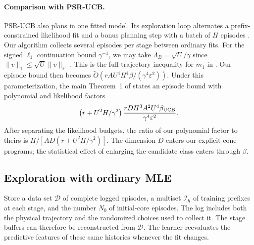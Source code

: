 \documentclass[sigconf,nonacm]{acmart}
\newcommand{\I}{\mathcal I}
\newcommand{\eps}{\varepsilon}
\newcommand{\softO}{\widetilde O}
\newcommand{\fused}[1]{\lVert #1\rVert_{\mathrm F}}
\begin{document}
\paragraph{Comparison with PSR-UCB.}
PSR-UCB also plans in one fitted model. Its exploration loop alternates a prefix-constrained likelihood fit and a bonus planning step with a batch of $H$ episodes \cite{psrucb}. Our algorithm collects several episodes per stage between ordinary fits. For the signed $\ell_1$ continuation bound $\gamma^{-1}$, we may take $\Lambda_B=\sqrt U/\gamma$ since $\|v\|_1\le\sqrt U\fused v$ \cite[Appendix~D.4]{bstable}. This is the full-trajectory inequality for $m_1$ in \citet[Condition~4.3]{omle}. Our episode bound then becomes $\softO(rAU^4H^4\beta/(\gamma^4\eps^2))$. Under this parameterization, the main Theorem~1 of \citet{psrucb} states an episode bound with polynomial and likelihood factors
\[
 \left(r+U^2H/\gamma^2\right)
 \frac{rD H^3 A^2 U^4\beta_{\rm UCB}}{\gamma^4\eps^2}.
\]
After separating the likelihood budgets, the ratio of our polynomial factor to theirs is $H/[AD(r+U^2H/\gamma^2)]$. The dimension $D$ enters our explicit cone programs; the statistical effect of enlarging the candidate class enters through $\beta$.

\subsection{Exploration with ordinary MLE}
Store a data set $\mathcal D$ of complete logged episodes, a multiset $\I_h$ of training prefixes at each stage, and the number $N_0$ of initial-core episodes. The log includes both the physical trajectory and the randomized choices used to collect it. The stage buffers can therefore be reconstructed from $\mathcal D$. The learner reevaluates the predictive features of these same histories whenever the fit changes.
\end{document}
